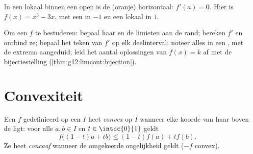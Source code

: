 \begin{omfigure}

{\small In een lokaal  binnen een open  is de 
(oranje) horizontaal: $f'(a) = 0$. Hier is $f(x) = x^3 - 3x$, met een  in $-1$ en een lokaal  in $1$.}
\end{omfigure}

\begin{method}[Verlooptabel]\label{met:g12:deriv:table}
Om een  $f$ te bestuderen: bepaal haar  en de limieten aan de
rand; bereken $f'$ en ontbind ze; bepaal het teken van $f'$ op elk
deelinterval; noteer alles in een , met de extrema aangeduid;
leid het aantal oplossingen van $f(x) = k$ af met de bijectiestelling
(\cref{thm:g12:limcont:bijection}).
\end{method}

\section{Convexiteit}

\begin{definition}\label{def:g12:deriv:convex}
Een  $f$ gedefinieerd op een  $I$ heet
\emph{convex} op $I$ wanneer elke koorde van haar 
boven de  ligt: voor alle $a, b \in I$ en $t \in \intcc{0}{1}$ geldt
\[
f\bigl((1-t)a + t b\bigr) \leq (1-t) f(a) + t f(b).
\]
Ze heet \emph{concaaf} wanneer de omgekeerde ongelijkheid
geldt ($-f$ convex).
\end{definition}

